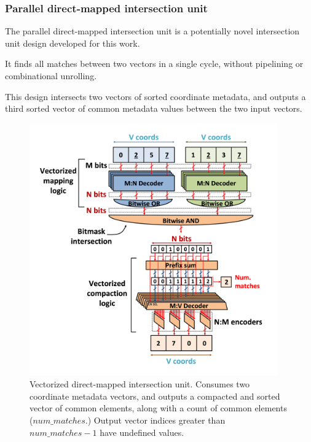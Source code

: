 \subsubsection{Parallel direct-mapped intersection unit}

The parallel direct-mapped intersection unit is a potentially novel intersection unit design developed for this work.

It finds all matches between two vectors in a single cycle, without pipelining or combinational unrolling.

This design intersects two vectors of sorted coordinate metadata, and outputs a third sorted vector of common metadata values between the two input vectors. 

\clearpage

\begin{figure}[H]
    \centering
    \includegraphics[width=0.95\textwidth]{figures/direct_mapped_isect.png}
    \caption{Vectorized direct-mapped intersection unit. Consumes two coordinate metadata vectors, and outputs a compacted and sorted vector of common elements, along with a count of common elements ($num\_matches$.) Output vector indices greater than $num\_matches - 1$ have undefined values.}
    \label{fig:direct_mapped_isect}
\end{figure}

\clearpage

